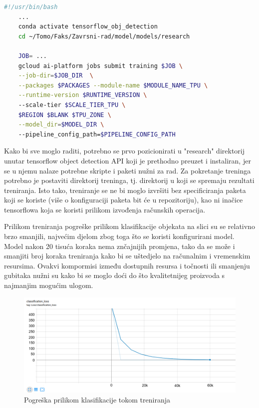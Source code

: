 \begin{lstlisting}[language=bash, tabsize=2]
    #!/usr/bin/bash
    ...
    conda activate tensorflow_obj_detection
    cd ~/Tomo/Faks/Zavrsni-rad/model/models/research
    
    JOB= ...
    gcloud ai-platform jobs submit training $JOB \
    --job-dir=$JOB_DIR  \
    --packages $PACKAGES --module-name $MODULE_NAME_TPU \
    --runtime-version $RUNTIME_VERSION \ 
    --scale-tier $SCALE_TIER_TPU \
    $REGION $BLANK $TPU_ZONE \
    --model_dir=$MODEL_DIR \ 
    --pipeline_config_path=$PIPELINE_CONFIG_PATH
\end{lstlisting}

Kako bi sve moglo raditi, potrebno se prvo pozicionirati u "research" direktorij unutar tensorflow object detection API koji je prethodno preuzet i instaliran, jer se u njemu nalaze potrebne skripte i paketi nužni za 
rad. Za pokretanje treninga potrebno je postaviti direktorij treninga, tj. direktorij u koji se spremaju rezultati treniranja. Isto tako, treniranje se ne bi moglo izvršiti 
bez specificiranja paketa koji se koriste (više o konfiguraciji paketa bit će u repozitoriju), kao ni inačice tensorflowa koja se koristi prilikom izvođenja računskih operacija.

Prilikom treniranja pogreške prilikom klasifikacije objekata na slici su se relativno brzo smanjili, najvećim djelom zbog toga što se koristi konfigurirani model. Model nakon 20 tisuća koraka
nema znčajnijih promjena, tako da se može i smanjiti broj koraka treniranja kako bi se uštedjelo na računalnim i vremenskim resursima. Ovakvi kompormisi između dostupnih resursa i točnosti ili smanjenju
gubitaka nužni su kako bi se moglo doći do što kvalitetnijeg proizvoda s najmanjim mogućim ulogom.

\begin{figure}[htb]
    \centering
    \includegraphics[width=12cm]{img/class-loss.png}
    \caption{Pogreška prilikom klasifikacije tokom treniranja}
    \label{Class-Loss}
\end{figure}


